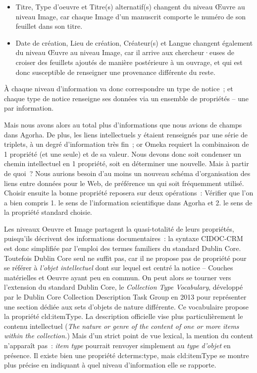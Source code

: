 \documentclass[a4paper,12pt, twoside]{book}
\begin{document}
\begin{itemize}
    \item \textsf{Titre, Type d’oeuvre} et \textsf{Titre(s) alternatif(s)} changent du niveau \textsf{Œuvre} au niveau \textsf{Image}, car chaque \textsf{Image} d’un manuscrit comporte le numéro de son feuillet dans son titre.\\

    \item \textsf{Date de création, Lieu de création, Créateur(s)} et \textsf{Langue} changent également du niveau \textsf{Œuvre} au niveau \textsf{Image}, car il arrive aux chercheur·euses de croiser des feuillets ajoutés de manière postérieure à un ouvrage, et qui est donc susceptible de renseigner une provenance différente du reste.
\end{itemize}

À chaque niveau d’information va donc correspondre un type de notice~; et chaque type de notice renseigne ses données via un ensemble de propriétés – une par information.

Mais nous avons alors au total plus d’informations que nous avions de champs dans Agorha. De plus, les liens intellectuels y étaient renseignés par une série de triplets, à un degré d’information très fin~; or Omeka requiert la combinaison de 1 propriété (et une seule) et de sa valeur. Nous devons donc soit condenser un chemin intellectuel en 1 propriété, soit en déterminer une nouvelle. Mais à partir de quoi~? Nous aurions besoin d’au moins un nouveau schéma d’organisation des liens entre données pour le Web, de préférence un qui soit fréquemment utilisé. Choisir ensuite la bonne propriété reposera sur deux opérations~: Vérifier que l'on a bien compris 1. le sens de l'information scientifique dans Agorha et 2. le sens de la propriété standard choisie.

Les niveaux \textsf{Oeuvre} et \textsf{Image} partagent la quasi-totalité de leurs propriétés, puisqu’ils décrivent des informations documentaires~: la syntaxe CIDOC-CRM est donc simplifiée par l’emploi des termes familiers du standard Dublin Core. Toutefois Dublin Core seul ne suffit pas, car il ne propose pas de propriété pour se référer à \textit{l’objet intellectuel} dont sur lequel est centré la notice -- \textsf{Couches matérielles} et \textsf{Oeuvre} ayant peu en commun. On peut alors se tourner vers l’extension du standard Dublin Core, le \textit{Collection Type Vocabulary}, développé par le Dublin Core Collection Description Task Group en 2013 pour représenter une section dédiée aux sets d’objets de nature différente. Ce vocabulaire propose la propriété \textsf{cld:itemType}. La description officielle vise plus particulièrement le contenu intellectuel (\textit{The nature or genre of the content of one or more items within the collection.}) Mais d’un strict point de vue lexical, la mention du content n’apparaît pas~: \textit{item type} pourrait renvoyer simplement au \textit{type d’objet} en présence. Il existe bien une propriété \textsf{dcterms:type}, mais \textsf{cld:itemType} se montre plus précise en indiquant à quel niveau d’information elle se rapporte.
\end{document}
